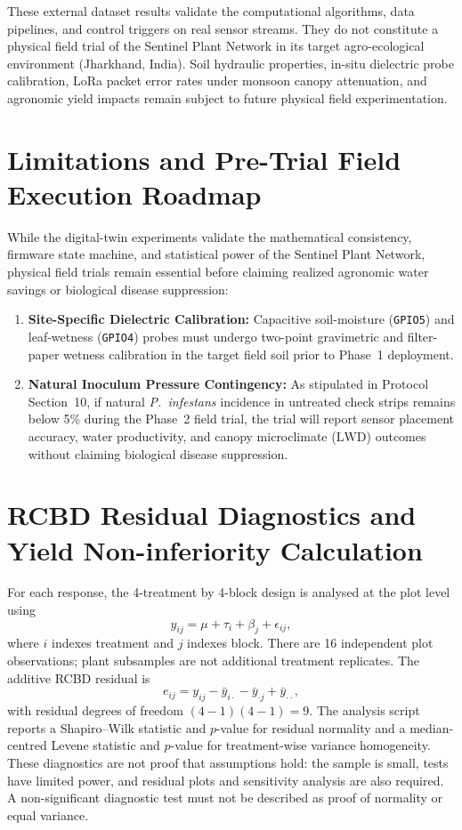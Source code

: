 \documentclass[10pt,twocolumn,a4paper]{article}
\begin{document}
These external dataset results validate the computational algorithms, data pipelines, and control triggers on real sensor streams. They do not constitute a physical field trial of the Sentinel Plant Network in its target agro-ecological environment (Jharkhand, India). Soil hydraulic properties, in-situ dielectric probe calibration, LoRa packet error rates under monsoon canopy attenuation, and agronomic yield impacts remain subject to future physical field experimentation.

\section{Limitations and Pre-Trial Field Execution Roadmap}

While the digital-twin experiments validate the mathematical consistency, firmware state machine, and statistical power of the Sentinel Plant Network, physical field trials remain essential before claiming realized agronomic water savings or biological disease suppression:
\begin{enumerate}\setlength{\itemsep}{1pt}\setlength{\parskip}{0pt}
  \item \textbf{Site-Specific Dielectric Calibration:} Capacitive soil-moisture (\texttt{GPIO5}) and leaf-wetness (\texttt{GPIO4}) probes must undergo two-point gravimetric and filter-paper wetness calibration in the target field soil prior to Phase~1 deployment.
  \item \textbf{Natural Inoculum Pressure Contingency:} As stipulated in Protocol Section~10, if natural \textit{P.\ infestans} incidence in untreated check strips remains below 5\% during the Phase~2 field trial, the trial will report sensor placement accuracy, water productivity, and canopy microclimate ($\mathrm{LWD}$) outcomes without claiming biological disease suppression.
\end{enumerate}

\appendix
\section{RCBD Residual Diagnostics and Yield Non-inferiority Calculation}

For each response, the 4-treatment by 4-block design is analysed at the plot level using
\[
 y_{ij}=\mu+\tau_i+\beta_j+\epsilon_{ij},
\]
where $i$ indexes treatment and $j$ indexes block. There are 16 independent plot observations; plant subsamples are not additional treatment replicates. The additive RCBD residual is
\[
 e_{ij}=y_{ij}-\bar y_{i\cdot}-\bar y_{\cdot j}+\bar y_{\cdot\cdot},
\]
with residual degrees of freedom $(4-1)(4-1)=9$. The analysis script reports a Shapiro--Wilk statistic and $p$-value for residual normality and a median-centred Levene statistic and $p$-value for treatment-wise variance homogeneity. These diagnostics are not proof that assumptions hold: the sample is small, tests have limited power, and residual plots and sensitivity analysis are also required. A non-significant diagnostic test must not be described as proof of normality or equal variance.
\end{document}
